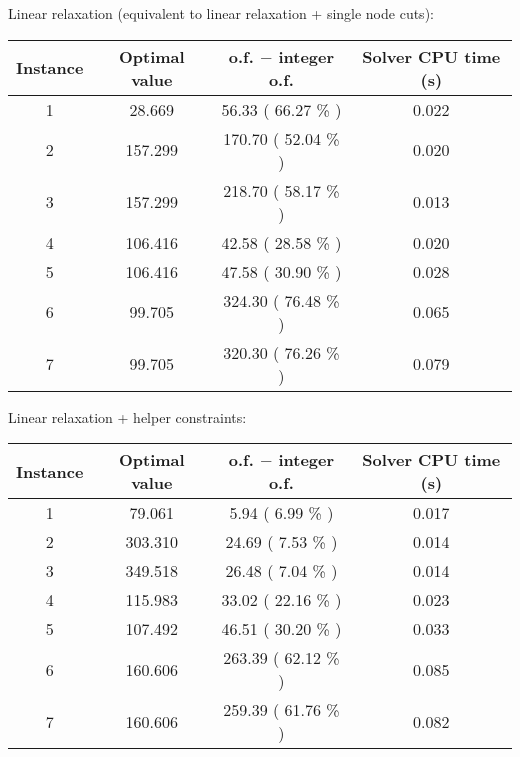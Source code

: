 Linear relaxation (equivalent to linear relaxation + single node cuts):
\begin{table}[h!]
	\centering
	\begin{tabular}{|c|c|c|c|}
		\hline
		\textbf{Instance} & \textbf{Optimal value} & \textbf{o.f. $-$ integer o.f.} & \textbf{Solver CPU time (s)} \\
		\hline
		1 &  28.669 &  56.33 ( 66.27 \% ) & 0.022 \\ \hline
		2 & 157.299 & 170.70 ( 52.04 \% ) & 0.020 \\ \hline
		3 & 157.299 & 218.70 ( 58.17 \% ) & 0.013 \\ \hline
		4 & 106.416 &  42.58 ( 28.58 \% ) & 0.020 \\ \hline
		5 & 106.416 &  47.58 ( 30.90 \% ) & 0.028 \\ \hline
		6 &  99.705 & 324.30 ( 76.48 \% ) & 0.065 \\ \hline
		7 &  99.705 & 320.30 ( 76.26 \% ) & 0.079 \\ \hline
	\end{tabular}
	\label{tab:instance_costs}
\end{table}

Linear relaxation + helper constraints:
\begin{table}[h!]
	\centering
	\begin{tabular}{|c|c|c|c|}
		\hline
		\textbf{Instance} & \textbf{Optimal value} & \textbf{o.f. $-$ integer o.f.} & \textbf{Solver CPU time (s)} \\
		\hline
		1 &  79.061 &   5.94 (  6.99 \% ) & 0.017 \\ \hline
		2 & 303.310 &  24.69 (  7.53 \% ) & 0.014 \\ \hline
		3 & 349.518 &  26.48 (  7.04 \% ) & 0.014 \\ \hline
		4 & 115.983 &  33.02 ( 22.16 \% ) & 0.023 \\ \hline
		5 & 107.492 &  46.51 ( 30.20 \% ) & 0.033 \\ \hline
		6 & 160.606 & 263.39 ( 62.12 \% ) & 0.085 \\ \hline
		7 & 160.606 & 259.39 ( 61.76 \% ) & 0.082 \\ \hline
	\end{tabular}
	\label{tab:instance_costs}
\end{table}

